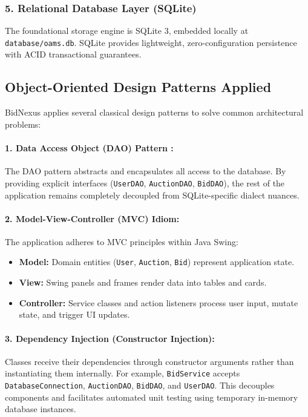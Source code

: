 \subsubsection{5. Relational Database Layer (SQLite)}
The foundational storage engine is SQLite 3, embedded locally at \texttt{database/oams.db}. SQLite provides lightweight, zero-configuration persistence with ACID transactional guarantees.

\subsection{Object-Oriented Design Patterns Applied}
BidNexus applies several classical design patterns to solve common architectural problems:

\paragraph{1. Data Access Object (DAO) Pattern \cite{gamma1994design}:}
The DAO pattern abstracts and encapsulates all access to the database. By providing explicit interfaces (\texttt{UserDAO}, \texttt{AuctionDAO}, \texttt{BidDAO}), the rest of the application remains completely decoupled from SQLite-specific dialect nuances.

\paragraph{2. Model-View-Controller (MVC) Idiom:}
The application adheres to MVC principles within Java Swing:
\begin{itemize}[noitemsep]
    \item \textbf{Model:} Domain entities (\texttt{User}, \texttt{Auction}, \texttt{Bid}) represent application state.
    \item \textbf{View:} Swing panels and frames render data into tables and cards.
    \item \textbf{Controller:} Service classes and action listeners process user input, mutate state, and trigger UI updates.
\end{itemize}

\paragraph{3. Dependency Injection (Constructor Injection):}
Classes receive their dependencies through constructor arguments rather than instantiating them internally. For example, \texttt{BidService} accepts \texttt{DatabaseConnection}, \texttt{AuctionDAO}, \texttt{BidDAO}, and \texttt{UserDAO}. This decouples components and facilitates automated unit testing using temporary in-memory database instances.

